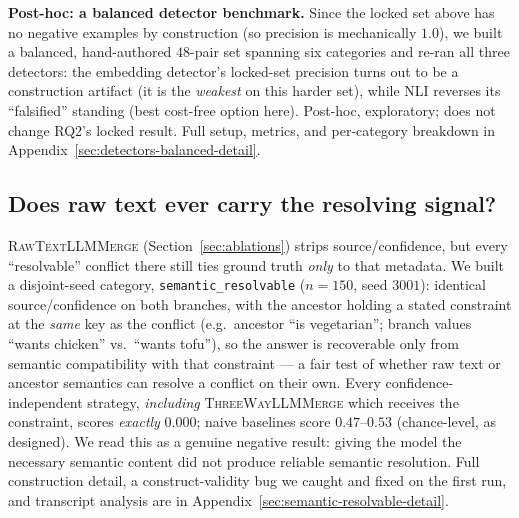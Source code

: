 \documentclass[11pt]{article}
\begin{document}
\begin{table}[t]
  \centering
  \small
  \caption{RQ2: conflict-detection F1 (locked set, $180$ pairs) vs.\ LLM-judge
  reference. Gap $=|$F1$_\text{cheap}-0.986|$; tolerance $0.05$.}
  \label{tab:detectors}
\end{table}

\textbf{Post-hoc: a balanced detector benchmark.}
\label{sec:detectors-balanced}
Since the locked set above has no negative examples by construction (so
precision is mechanically $1.0$), we built a balanced, hand-authored
$48$-pair set spanning six categories and re-ran all three detectors: the
embedding detector's locked-set precision turns out to be a construction
artifact (it is the \emph{weakest} on this harder set), while NLI reverses
its ``falsified'' standing (best cost-free option here). Post-hoc,
exploratory; does not change RQ2's locked result. Full setup, metrics, and
per-category breakdown in Appendix~\ref{sec:detectors-balanced-detail}.

\subsection{Does raw text ever carry the resolving signal?}
\label{sec:semantic-resolvable}

\textsc{RawTextLLMMerge} (Section~\ref{sec:ablations}) strips
source/confidence, but every ``resolvable'' conflict there still ties
ground truth \emph{only} to that metadata. We built a disjoint-seed
category, \texttt{semantic\_resolvable} ($n{=}150$, seed $3001$): identical
source/confidence on both branches, with the ancestor holding a stated
constraint at the \emph{same} key as the conflict (e.g.\ ancestor ``is
vegetarian''; branch values ``wants chicken'' vs.\ ``wants tofu''), so the
answer is recoverable only from semantic compatibility with that
constraint --- a fair test of whether raw text or ancestor semantics can
resolve a conflict on their own. Every confidence-independent strategy,
\emph{including} \textsc{ThreeWayLLMMerge} which receives the constraint,
scores \emph{exactly} $0.000$; naive baselines score $0.47$--$0.53$
(chance-level, as designed). We read this as a genuine negative result:
giving the model the necessary semantic content did not produce reliable
semantic resolution. Full construction detail, a construct-validity bug we
caught and fixed on the first run, and transcript analysis are in
Appendix~\ref{sec:semantic-resolvable-detail}.
\end{document}
